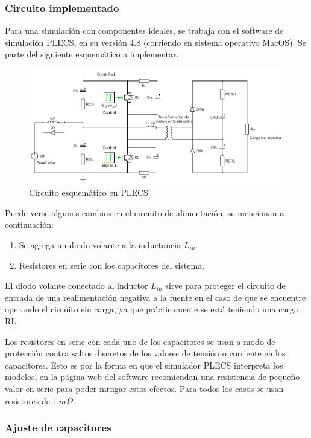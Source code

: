 \subsubsection{Circuito implementado}

Para una simulación con componentes ideales, se trabaja con el software de simulación PLECS, en su versión 4.8 (corriendo en sistema operativo MacOS). Se parte del siguiente esquemático a implementar. 

\begin{figure}
	\centering
	\includegraphics[width=1\linewidth]{../schematic_mod}
	\caption{Circuito esquemático en PLECS.}
	\label{fig:schematic}
\end{figure}

Puede verse algunos cambios en el circuito de alimentación, se mencionan a continuación:

\begin{enumerate}
	\item Se agrega un diodo volante a la inductancia $L_{in}$.
	\item Resistores en serie con los capacitores del sistema.
\end{enumerate}

El diodo volante conectado al inductor $L_{in}$ sirve para proteger el circuito de entrada de una realimentación negativa a la fuente en el caso de que se encuentre operando el circuito sin carga, ya que prácticamente se está teniendo una carga RL.

Los resistores en serie con cada uno de los capacitores se usan a modo de protección contra saltos discretos de los valores de tensión o corriente en los capacitores. Esto es por la forma en que el simulador PLECS interpreta los modelos, en la página web del software recomiendan una resistencia de pequeño valor en serie para poder mitigar estos efectos. Para todos los casos se usan resistores de $1 \ m\Omega$.


\subsubsection{Ajuste de capacitores}

